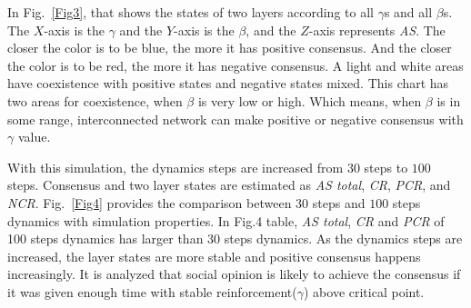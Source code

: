 \documentclass[english]{cccconf}
\begin{document}
In Fig.~\ref{Fig3}, that shows the states of two layers according to all $\gamma$s and all $\beta$s. The $X$-axis is the $\gamma$ and the $Y$-axis is the $\beta$, and the $Z$-axis represents \textit{AS}. The closer the color is to be blue, the more it has positive consensus. And the closer the color is to be red, the more it has negative consensus. A light and white areas have coexistence with positive states and negative states mixed. This chart has two areas for coexistence, when $\beta$ is very low or high. Which means, when $\beta$ is in some range, interconnected network can make positive or negative consensus with $\gamma$ value.     

With this simulation, the dynamics steps are increased from $30$ steps to $100$ steps. Consensus and two layer states are estimated as \textit{AS total}, \textit{CR}, \textit{PCR}, and \textit{NCR}. Fig.~\ref{Fig4} provides the comparison between $30$ steps and $100$ steps dynamics with simulation properties. In Fig.4 table, \textit{AS total}, \textit{CR} and \textit{PCR} of 100 steps dynamics  has larger than $30$ steps dynamics. As the dynamics steps are increased, the layer states are more stable and positive consensus happens increasingly. It is analyzed that social opinion is likely to achieve the consensus if it was given enough time with stable reinforcement($\gamma$) above critical point.
\end{document}
